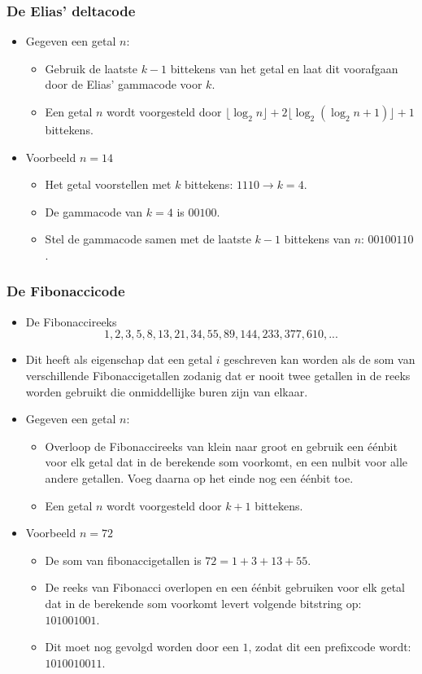 \subsubsection{De Elias' deltacode}
\begin{itemize}
    \item Gegeven een getal $n$:
    \begin{itemize}
        \item Gebruik de laatste $k-1$ bittekens van het getal en laat dit voorafgaan door de Elias' gammacode voor $k$.
        \item Een getal $n$ wordt voorgesteld door $\lfloor \log_2 n\rfloor  + 2\lfloor \log_2(\log_2 n + 1)\rfloor + 1$ bittekens.
    \end{itemize}
    \item Voorbeeld $n = 14$
    \begin{itemize}
        \item Het getal voorstellen met $k$ bittekens: $1110 \rightarrow k = 4$.
        \item De gammacode van $k = 4$ is $00100$.
        \item Stel de gammacode samen met de laatste $k-1$ bittekens van $n$: $00100110$.
    \end{itemize}
\end{itemize}

\subsubsection{De Fibonaccicode}
\begin{itemize}
    \item De Fibonaccireeks
    $$1, 2, 3, 5, 8, 13, 21, 34, 55, 89, 144, 233, 377, 610, ...$$
    \item Dit heeft als eigenschap dat een getal $i$ geschreven kan worden als de som van verschillende Fibonaccigetallen zodanig dat er nooit twee getallen in de reeks worden gebruikt die onmiddellijke buren zijn van elkaar.
    \item Gegeven een getal $n$:
    \begin{itemize}
        \item Overloop de Fibonaccireeks van klein naar groot en gebruik een éénbit voor elk getal dat in de berekende som voorkomt, en een nulbit voor alle andere getallen. Voeg daarna op het einde nog een éénbit toe.
        \item Een getal $n$ wordt voorgesteld door $k + 1$ bittekens.
    \end{itemize}
    \item Voorbeeld $n = 72$
    \begin{itemize}
        \item De som van fibonaccigetallen is $72 = 1 + 3 + 13 + 55$.
        \item De reeks van Fibonacci overlopen en een éénbit gebruiken voor elk getal dat in de berekende som voorkomt levert volgende bitstring op: $101001001$.
        \item Dit moet nog gevolgd worden door een $1$, zodat dit een prefixcode wordt: $1010010011$.
    \end{itemize}
\end{itemize}

